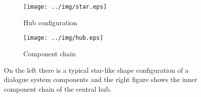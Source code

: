 \begin{figure}[ht]
\centering
\begin{subfigure}{0.5\textwidth}
  \centering
  \texttt{[image: ../img/star.eps]}
  \caption{Hub configuration}
  \label{fig:hub}
\end{subfigure}%
\begin{subfigure}{0.5\textwidth}
  \centering
  \texttt{[image: ../img/hub.eps]}
  \caption{Component chain}
  \label{fig:chain}
\end{subfigure}
\caption{On the left there is a typical star-like shape configuration of a dialogue system components and the right figure shows the inner component chain of the central hub.} %
\label{fig:test}
\end{figure}

